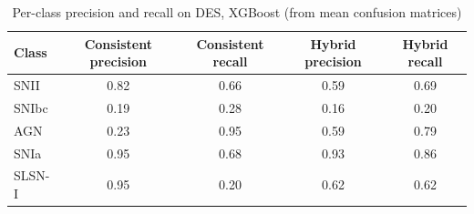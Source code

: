 \begin{table}
\centering
\caption{Per-class precision and recall on DES, XGBoost (from mean confusion matrices)}
\begin{tabular}{lcccc}
\hline
Class & Consistent precision & Consistent recall & Hybrid precision & Hybrid recall \\
\hline
SNII & 0.82 & 0.66 & 0.59 & 0.69 \\
SNIbc & 0.19 & 0.28 & 0.16 & 0.20 \\
AGN & 0.23 & 0.95 & 0.59 & 0.79 \\
SNIa & 0.95 & 0.68 & 0.93 & 0.86 \\
SLSN-I & 0.95 & 0.20 & 0.62 & 0.62 \\
\hline
\end{tabular}
\end{table}
